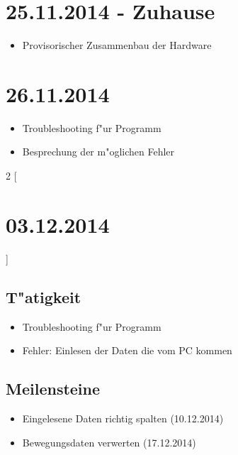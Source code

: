 \documentclass[11pt,a4paper]{article}
\begin{document}
\section*{25.11.2014 - Zuhause}
\begin{itemize}
\item Provisorischer Zusammenbau der Hardware
\end{itemize}


\section*{26.11.2014}
\begin{itemize}
\item Troubleshooting f"ur Programm
\item Besprechung der m"oglichen Fehler
\end{itemize}


\begin{multicols}{2}
[\section*{  03.12.2014  }] 


\subsection*{T"atigkeit}
\begin{itemize}
\item Troubleshooting f"ur Programm
\item Fehler: Einlesen der Daten die vom PC kommen
\end{itemize}

\columnbreak

\subsection*{Meilensteine}

\begin{itemize}
\item Eingelesene Daten richtig spalten (10.12.2014)
\item Bewegungsdaten verwerten (17.12.2014)
\end{itemize}

\end{multicols}

\newpage
\end{document}
